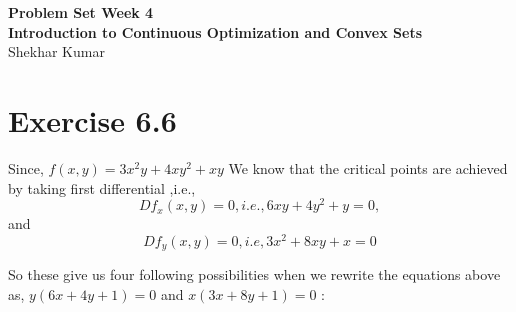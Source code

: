 \documentclass[letterpaper,12pt]{article}
\theoremstyle{definition}
\begin{document}
\begin{flushleft}
\textbf{\large{Problem Set Week 4}} \\
\vspace{2mm}
\textbf{\large{Introduction to Continuous Optimization and Convex Sets}} \\
\vspace{2mm}
Shekhar Kumar \\
\end{flushleft}

\section*{Exercise 6.6}
 Since, $f(x, y) = 3x^2y+4xy^2+xy$ 
\newline
\doublespacing
 We  know  that  the  critical points are achieved by taking first differential ,i.e.,
\singlespacing
\begin{equation}
Df_{x}(x, y) = 0  ,i.e.,    6xy+4y^2+y = 0 , 
\end{equation}
and
\begin{equation}
Df_{y}(x, y) = 0 , i.e,
3x^2+8xy+x  = 0 
\end{equation}

So these give us four  following possibilities when we rewrite the equations above as,  $y(6x + 4y+ 1)= 0$  and  $x(3x+ 8y +1) = 0$ :
\newline
\end{document}
